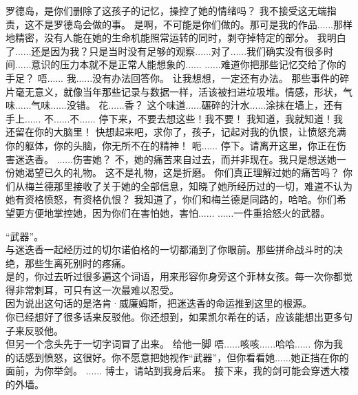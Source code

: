 \documentclass[openany]{book}
\begin{document}
\begin{dialogue}
     罗德岛，是你们删除了这孩子的记忆，操控了她的情绪吗？
     我不接受这无端指责，这不是罗德岛会做的事。
     是啊，不可能是你们做的。那可是我的作品......那样地精密，没有人能在她的生命机能照常运转的同时，剥夺掉特定的部分。
     我明白了......还是因为我？只是当时没有足够的观察......对了......我们确实没有很多时间......意识的压力本就不是正常人能想象的......
     ......难道你把那些记忆交给了你的手足？
     唔......
     我......没有办法回答你。
     让我想想，一定还有办法。
     那些事件的碎片毫无意义，就像当年那些记录与数据一样，活该被扫进垃圾堆。情感，形状，气味......气味......没错。
     花......香？
     这个味道......碾碎的汁水......涂抹在墙上，还有手上......
     不......不......
     停下来，不要去想这些！我不要！
     我知道，我就知道！我还留在你的大脑里！
     快想起来吧，求你了，孩子，记起对我的仇恨，让愤怒充满你的躯体，你的头脑，你无所不在的精神！
     呃......
     停下。请离开这里，你正在伤害迷迭香。
     ......伤害她？
     不，她的痛苦来自过去，而并非现在。我只是想送她一份她渴望已久的礼物。
     这不是礼物，这是折磨。
     你们真正理解过她的痛苦吗？
     你们从梅兰德那里接收了关于她的全部信息，知晓了她所经历过的一切，难道不认为她有资格愤怒，有资格仇恨？
     我知道了，你们和梅兰德是同路的，哈哈。你们希望更方便地掌控她，因为你们在害怕她，害怕......
     ......一件重拾怒火的武器。\par
    “武器”。\\
    与迷迭香一起经历过的切尔诺伯格的一切都涌到了你眼前。那些拼命战斗时的决绝，那些生离死别时的疼痛。\\
    是的，你过去听过很多遍这个词语，用来形容你身旁这个菲林女孩。每一次你都觉得非常刺耳，可只有这一次最难以忍受。\\
    因为说出这句话的是洛肯·威廉姆斯，把迷迭香的命运推到这里的根源。\\
    你已经想好了很多话来反驳他。你还想到，如果凯尔希在的话，应该能想出更多句子来反驳他。\\
    但另一个念头先于一切字词冒了出来。
     给他一脚
     唔......咳咳......哈哈......
     你为我的话感到愤怒，这很好。你不愿意把她视作“武器”，但你看看她......她正挡在你的面前，为你举剑。
     ......
     博士，请站到我身后来。
     接下来，我的剑可能会穿透大楼的外墙。

\end{dialogue}
\end{document}
